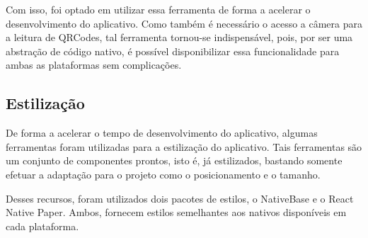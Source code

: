 Com isso, foi optado em utilizar essa ferramenta de forma a acelerar o desenvolvimento do aplicativo. Como também é necessário o acesso a câmera para a leitura de QRCodes, tal ferramenta tornou-se indispensável, pois, por ser uma abstração de código nativo, é possível disponibilizar essa funcionalidade para ambas as plataformas sem complicações.


\subsection{Estilização}

De forma a acelerar o tempo de desenvolvimento do aplicativo, algumas ferramentas foram utilizadas para a estilização do aplicativo. Tais ferramentas são um conjunto de componentes prontos, isto é, já estilizados, bastando somente efetuar a adaptação para o projeto como o posicionamento e o tamanho.

Desses recursos, foram utilizados dois pacotes de estilos, o NativeBase e o React Native Paper. Ambos, fornecem estilos semelhantes aos nativos disponíveis em cada plataforma.


